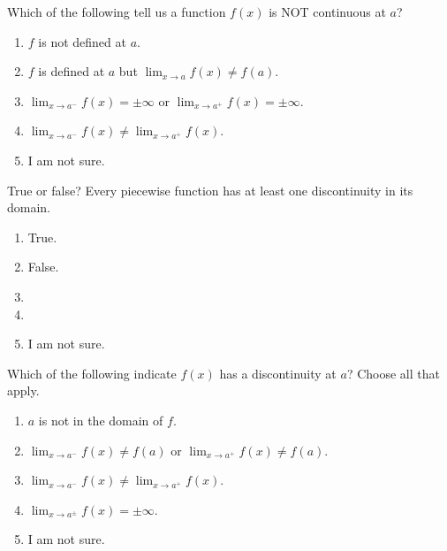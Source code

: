 \documentclass[aspectratio=169, 14pt, t]{beamer}  %
\begin{document}
\begin{poll}
  Which of the following tell us a function \(f(x)\) is NOT continuous at \(a\)?

  \begin{enumerate}
    \item \(f\) is not defined at \(a\).
    \item \(f\) is defined at \(a\) but \(\lim_{x \to a} f(x) \ne f(a)\).
    \item \(\lim_{x \to a^{-}} f(x) = \pm \infty\) or \(\lim_{x \to a^{+}} f(x) = \pm \infty\).
    \item \(\lim_{x \to a^{-}} f(x) \ne \lim_{x \to a^{+}} f(x)\).
    \item I am not sure.
  \end{enumerate}
\end{poll}

\begin{poll}
  True or false? Every piecewise function has at least one discontinuity in its domain.

  \begin{enumerate}
    \item True.
    \item False.
    \item
    \item
    \item I am not sure.
  \end{enumerate}
\end{poll}

\begin{poll}
  Which of the following indicate \(f(x)\) has a discontinuity at \(a\)?  Choose all that apply.

  \begin{enumerate}
    \item \(a\) is not in the domain of \(f\).
    \item \(\lim_{x \to a^{-}} f(x) \ne f(a)\) or \(\lim_{x \to a^{+}} f(x) \ne f(a)\).
    \item \(\lim_{x \to a^{-}} f(x) \ne \lim_{x \to a^{+}} f(x)\).
    \item \(\lim_{x \to a^{\pm}} f(x) = \pm \infty\).
    \item I am not sure.
  \end{enumerate}
\end{poll}
\end{document}
